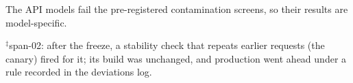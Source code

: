 \begin{landscape}
\begin{table}[htbp]
\begin{threeparttable}
\begin{tablenotes}[flushleft]
\item The API models fail the pre-registered contamination screens, so their results are model-specific.
\item $^{\ddagger}$span-02: after the freeze, a stability check that repeats earlier requests (the canary) fired for it; its build was unchanged, and production went ahead under a rule recorded in the deviations log.
\end{tablenotes}
\end{threeparttable}
\end{table}
\end{landscape}

